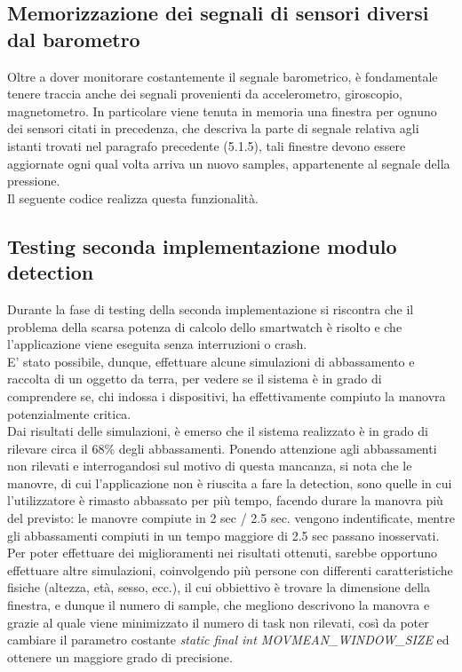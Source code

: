 \documentclass[a4paper, oneside]{book}
\begin{document}
\subsection{Memorizzazione dei segnali di sensori diversi dal barometro}
Oltre a dover monitorare costantemente il segnale barometrico, è fondamentale tenere traccia anche dei segnali provenienti da accelerometro, giroscopio, magnetometro.
In particolare viene tenuta in memoria una finestra per ognuno dei sensori citati in precedenza, che descriva la parte di segnale relativa agli istanti trovati nel paragrafo precedente (5.1.5), tali finestre devono essere aggiornate ogni qual volta arriva un nuovo samples, appartenente al segnale della pressione. \\
Il seguente codice realizza questa funzionalità.
\vspace{6mm}

\vspace{2mm}


\subsection{Testing seconda implementazione modulo detection}
Durante la fase di testing della seconda implementazione si riscontra che il problema della scarsa potenza di calcolo dello smartwatch è risolto e che l'applicazione viene eseguita senza interruzioni o crash. \\
E' stato possibile, dunque, effettuare alcune simulazioni di abbassamento e raccolta di un oggetto da terra, per vedere se il sistema è in grado di comprendere se, chi indossa i dispositivi, ha effettivamente compiuto la manovra potenzialmente critica.\\
Dai risultati delle simulazioni, è emerso che il sistema realizzato è in grado di rilevare circa il 68\% degli abbassamenti. Ponendo attenzione agli abbassamenti non rilevati e interrogandosi sul motivo di questa mancanza, si nota che le manovre, di cui l'applicazione non è riuscita a fare la detection, sono quelle in cui l'utilizzatore è rimasto abbassato per più tempo, facendo durare la manovra più del previsto: le manovre compiute in 2 sec / 2.5 sec. vengono indentificate, mentre gli abbassamenti compiuti in un tempo maggiore di 2.5 sec passano inosservati. \\
Per poter effettuare dei miglioramenti nei risultati ottenuti, sarebbe opportuno effettuare altre simulazioni, coinvolgendo più persone con differenti caratteristiche fisiche (altezza, età, sesso, ecc.), il cui obbiettivo è trovare la dimensione della finestra, e dunque il numero di sample, che megliono descrivono la manovra e grazie al quale viene minimizzato il numero di task non rilevati, così da poter cambiare il parametro costante \textit{static final int MOVMEAN\_WINDOW\_SIZE} ed ottenere un maggiore grado di precisione.
\clearpage
\end{document}
